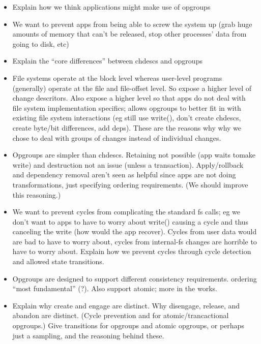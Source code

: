 \begin{itemize}
\item Explain how we think applications might make use of opgroups
\item We want to prevent apps from being able to screw the system up
  (grab huge amounts of memory that can't be released, stop other
  processes' data from going to disk, etc)
\item Explain the ``core differences'' between chdescs and
  opgroups
\item File systems operate at the block level whereas user-level
  programs (generally) operate at the file and file-offset level.
  So expose a higher level of change descritors. Also expose a
  higher level so that apps do not deal with file system
  implementation specifics; allows opgroups to better fit in with
  existing file system interactions (eg still use write(), don't
  create chdescs, create byte/bit differences, add deps). These are
  the reasons why why we chose to deal with groups of changes
  instead of individual changes.
\item Opgroups are simpler than chdescs. Retaining not possible (app
  waits tomake write) and destruction not an issue (unless a
  transaction). Apply/rollback and dependency removal aren't seen as
  helpful since apps are not doing transformations, just specifying
  ordering requirements. (We should improve this reasoning.)
\item We want to prevent cycles from complicating the standard fs
  calls; eg we don't want to apps to have to worry about write()
  causing a cycle and thus canceling the write (how would the app
  recover). Cycles from user data would are bad to have to worry
  about, cycles from internal-fs changes are horrible to have to
  worry about. Explain how we prevent cycles through cycle detection
  and allowed state transitions.
\item Opgroups are designed to support different consistency
  requirements. ordering ``most fundamental'' (?). Also support
  atomic; more in the works.
\item Explain why create and engage are distinct. Why disengage,
  release, and abandon are distinct. (Cycle prevention and for
  atomic/trancactional opgroups.) Give transitions for opgroups and
  atomic opgroups, or perhaps just a sampling, and the reasoning
  behind these.
\end{itemize}

